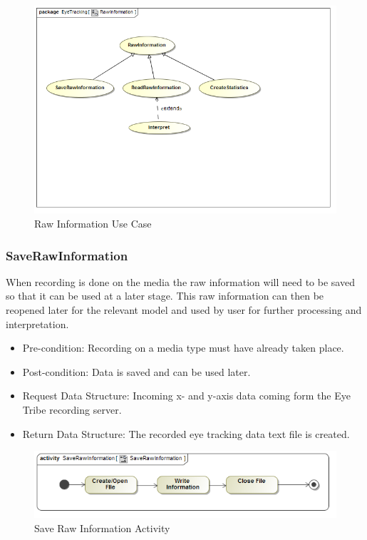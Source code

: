 \begin{figure}[!ht]
	\centering
	\includegraphics[scale=0.5]{Diagrams/Use_Case_Diagram__RawInformation.png}
	\caption{Raw Information Use Case}
\end{figure}
	
	\subsubsection{SaveRawInformation}
When recording is done on the media the raw information will need to be saved so that it can be used at a later stage. This raw information can then be reopened later for the relevant model and used by user for further processing and interpretation.
\begin{itemize}
\item Pre-condition: Recording on a media type must have already taken place.
\item Post-condition: Data is saved and can be used later.
\item Request Data Structure: Incoming x- and y-axis data coming form the Eye Tribe recording server.
\item Return Data Structure: The recorded eye tracking data text file is created.
\end{itemize}

\begin{figure}[!ht]
	\centering
	\includegraphics[scale=0.5]{Diagrams/Activity_Diagram__SaveRawInformation__SaveRawInformation.png}
	\caption{Save Raw Information Activity}
\end{figure}

